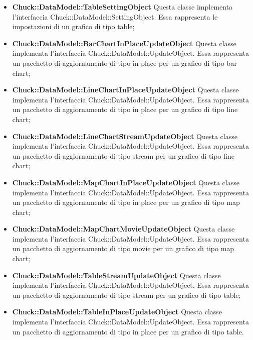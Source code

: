\begin{itemize}
		\item \textbf{Chuck::DataModel::TableSettingObject} Questa classe implementa l'interfaccia \linebreak Chuck::DataModel::SettingObject. Essa rappresenta le impostazioni di un grafico di tipo table;

		\item \textbf{Chuck::DataModel::BarChartInPlaceUpdateObject} Questa classe implementa l'interfaccia Chuck::DataModel::UpdateObject. Essa rappresenta un pacchetto di aggiornamento di tipo in place per un grafico di tipo bar chart;

		\item \textbf{Chuck::DataModel::LineChartInPlaceUpdateObject} Questa classe implementa l'interfaccia Chuck::DataModel::UpdateObject. Essa rappresenta un pacchetto di aggiornamento di tipo in place per un grafico di tipo line chart;

		\item \textbf{Chuck::DataModel::LineChartStreamUpdateObject} Questa classe implementa l'interfaccia Chuck::DataModel::UpdateObject. Essa rappresenta un pacchetto di aggiornamento di tipo stream per un grafico di tipo line chart;

		\item \textbf{Chuck::DataModel::MapChartInPlaceUpdateObject} Questa classe implementa l'interfaccia Chuck::DataModel::UpdateObject. Essa rappresenta un pacchetto di aggiornamento di tipo in place per un grafico di tipo map chart;

		\item \textbf{Chuck::DataModel::MapChartMovieUpdateObject} Questa classe implementa l'interfaccia Chuck::DataModel::UpdateObject. Essa rappresenta un pacchetto di aggiornamento di tipo movie per un grafico di tipo map chart;

		\item \textbf{Chuck::DataModel::TableStreamUpdateObject} Questa classe implementa l'interfaccia Chuck::DataModel::UpdateObject. Essa rappresenta un pacchetto di aggiornamento di tipo stream per un grafico di tipo table;

		\item \textbf{Chuck::DataModel::TableInPlaceUpdateObject} Questa classe implementa l'interfaccia Chuck::DataModel::UpdateObject. Essa rappresenta un pacchetto di aggiornamento di tipo in place per un grafico di tipo table.
	\end{itemize}
